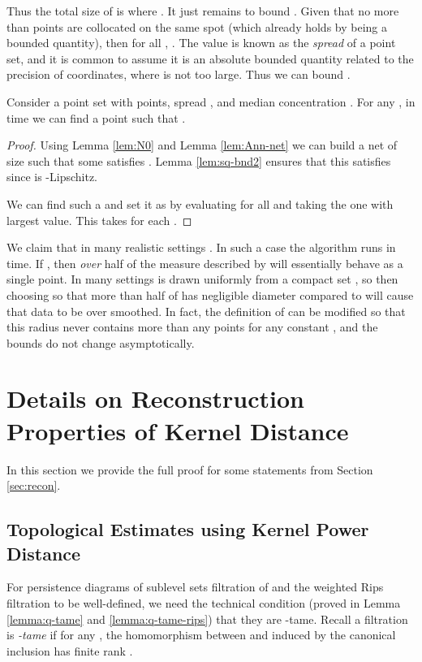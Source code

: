 \documentclass[11pt]{myclass}
\begin{document}
Thus the total size of  is  where .  
It just remains to bound .  Given that no more than  points are collocated on the same spot (which already holds by  being a bounded quantity), then for all , .  
The value  is known as the \emph{spread} of a point set, and it is common to assume it is an absolute bounded quantity related to the precision of coordinates, where  is not too large.  Thus we can bound .  

\begin{theorem}
\label{thm:phat+}
Consider a point set  with  points, spread , and median concentration .  
For any , in time  we can find a point  such that .  
\end{theorem}
\begin{proof}
Using Lemma \ref{lem:N0} and Lemma \ref{lem:Ann-net} we can build a net  of size  such that some  satisfies .  Lemma \ref{lem:sq-bnd2} ensures that this  satisfies  since  is -Lipschitz.  

We can find such a  and set it as  by evaluating  for all  and taking the one with largest value.  This takes  for each . 
\end{proof}


We claim that in many realistic settings .  In such a case the algorithm runs in  time.  
If , then \emph{over} half of the measure described by  will essentially behave as a single point.  In many settings  is drawn uniformly from a compact set , so then choosing  so that more than half of  has negligible diameter compared to  will cause that data to be over smoothed.  
In fact, the definition of  can be modified so that this radius never contains more than any  points for any constant , and the bounds do not change asymptotically.  





\section{Details on Reconstruction Properties of Kernel Distance}
\label{app:recon}

In this section we provide the full proof for some statements from Section \ref{sec:recon}.  

\subsection{Topological Estimates using Kernel Power Distance}
\label{subsec:approximation}
For persistence diagrams of sublevel sets filtration of  and the weighted Rips filtration  to be well-defined, we need the technical condition (proved in Lemma \ref{lemma:q-tame} and \ref{lemma:q-tame-rips}) that they are -tame. 
Recall a filtration  is \emph{-tame} if for any , the homomorphism between 
 and  induced by the canonical inclusion has finite rank \cite{ChazalCohen-SteinerGlisse2009,ChazalSilvaGlisse2013}. 
\end{document}
